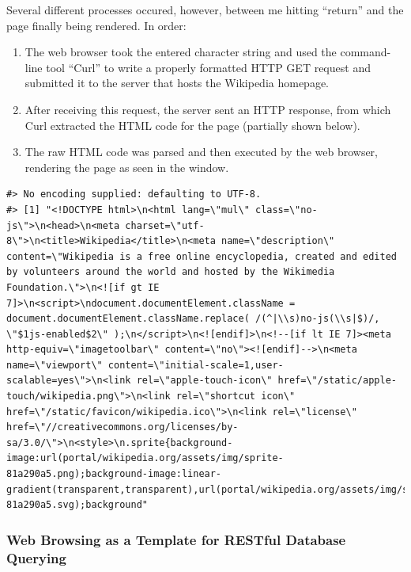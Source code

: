 \documentclass[]{book}
\begin{document}
Several different processes occured, however, between me hitting
``return'' and the page finally being rendered. In order:

\begin{enumerate}
\def\labelenumi{\arabic{enumi}.}
\item
  The web browser took the entered character string and used the
  command-line tool ``Curl'' to write a properly formatted HTTP GET
  request and submitted it to the server that hosts the Wikipedia
  homepage.
\item
  After receiving this request, the server sent an HTTP response, from
  which Curl extracted the HTML code for the page (partially shown
  below).
\item
  The raw HTML code was parsed and then executed by the web browser,
  rendering the page as seen in the window.
\end{enumerate}

\begin{verbatim}
#> No encoding supplied: defaulting to UTF-8.
#> [1] "<!DOCTYPE html>\n<html lang=\"mul\" class=\"no-js\">\n<head>\n<meta charset=\"utf-8\">\n<title>Wikipedia</title>\n<meta name=\"description\" content=\"Wikipedia is a free online encyclopedia, created and edited by volunteers around the world and hosted by the Wikimedia Foundation.\">\n<![if gt IE 7]>\n<script>\ndocument.documentElement.className = document.documentElement.className.replace( /(^|\\s)no-js(\\s|$)/, \"$1js-enabled$2\" );\n</script>\n<![endif]>\n<!--[if lt IE 7]><meta http-equiv=\"imagetoolbar\" content=\"no\"><![endif]-->\n<meta name=\"viewport\" content=\"initial-scale=1,user-scalable=yes\">\n<link rel=\"apple-touch-icon\" href=\"/static/apple-touch/wikipedia.png\">\n<link rel=\"shortcut icon\" href=\"/static/favicon/wikipedia.ico\">\n<link rel=\"license\" href=\"//creativecommons.org/licenses/by-sa/3.0/\">\n<style>\n.sprite{background-image:url(portal/wikipedia.org/assets/img/sprite-81a290a5.png);background-image:linear-gradient(transparent,transparent),url(portal/wikipedia.org/assets/img/sprite-81a290a5.svg);background"
\end{verbatim}

\subsubsection*{Web Browsing as a Template for RESTful Database
Querying}\label{web-browsing-as-a-template-for-restful-database-querying}
\end{document}
